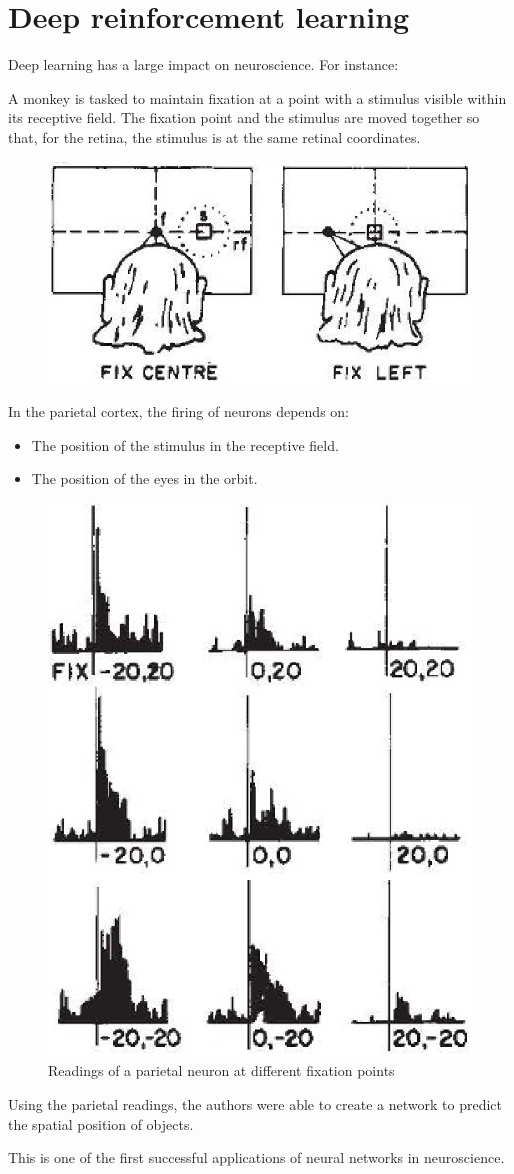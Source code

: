 \chapter{Deep reinforcement learning}


Deep learning has a large impact on neuroscience. For instance:
\begin{casestudy}
    A monkey is tasked to maintain fixation at a point with a stimulus visible within its receptive field. The fixation point and the stimulus are moved together so that, for the retina, the stimulus is at the same retinal coordinates.

    \begin{figure}[H]
        \centering
        \includegraphics[width=0.3\linewidth]{./img/monkey_parietal1.png}
    \end{figure}

    In the parietal cortex, the firing of neurons depends on:
    \begin{itemize}
        \item The position of the stimulus in the receptive field.
        \item The position of the eyes in the orbit.
    \end{itemize}

    \begin{figure}[H]
        \centering
        \includegraphics[width=0.2\linewidth]{./img/monkey_parietal2.png}
        \caption{Readings of a parietal neuron at different fixation points}
    \end{figure}

    Using the parietal readings, the authors were able to create a network to predict the spatial position of objects.
    
    \indenttbox
    \begin{remark}
        This is one of the first successful applications of neural networks in neuroscience.
    \end{remark}
\end{casestudy}


